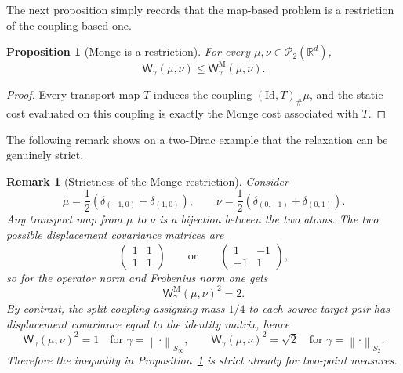 \documentclass{article}
\newtheorem{proposition}[theorem]{Proposition}
\newtheorem{remark}[theorem]{Remark}
\newcommand{\R}{\mathbb{R}}
\newcommand{\cP}{\mathcal{P}}
\newcommand{\Wg}{\mathsf{W}_{\gamma}}
\newcommand{\WgM}{\mathsf{W}_{\gamma}^{\mathrm{M}}}
\newcommand{\Id}{\mathrm{Id}}
\newcommand{\norm}[1]{\left\lVert #1 \right\rVert}
\begin{document}
The next proposition simply records that the map-based problem is a restriction of the coupling-based one.
\begin{proposition}[Monge is a restriction]
\label{prop:monge}
For every $\mu,\nu\in\cP_2(\R^d)$,
$$
\Wg(\mu,\nu)\le \WgM(\mu,\nu).
$$
\end{proposition}

\begin{proof}
Every transport map $T$ induces the coupling $(\Id,T)_\#\mu$, and the static cost evaluated on this coupling is exactly the Monge cost associated with $T$.
\end{proof}

The following remark shows on a two-Dirac example that the relaxation can be genuinely strict.
\begin{remark}[Strictness of the Monge restriction]
Consider
$$
\mu=\frac12(\delta_{(-1,0)}+\delta_{(1,0)}),
\qquad
\nu=\frac12(\delta_{(0,-1)}+\delta_{(0,1)}).
$$
Any transport map from $\mu$ to $\nu$ is a bijection between the two atoms. The two possible displacement covariance matrices are
$$
\begin{pmatrix}
1 & 1\\
1 & 1
\end{pmatrix}
\qquad\text{or}\qquad
\begin{pmatrix}
1 & -1\\
-1 & 1
\end{pmatrix},
$$
so for the operator norm and Frobenius norm one gets
$$
\WgM(\mu,\nu)^2=2.
$$
By contrast, the split coupling assigning mass $1/4$ to each source-target pair has displacement covariance equal to the identity matrix, hence
$$
\Wg(\mu,\nu)^2=
1
\quad\text{for }\gamma=\norm{\cdot}_{S_\infty},
\qquad
\Wg(\mu,\nu)^2=
\sqrt{2}
\quad\text{for }\gamma=\norm{\cdot}_{S_2}.
$$
Therefore the inequality in Proposition~\ref{prop:monge} is strict already for two-point measures.
\end{remark}
\end{document}
